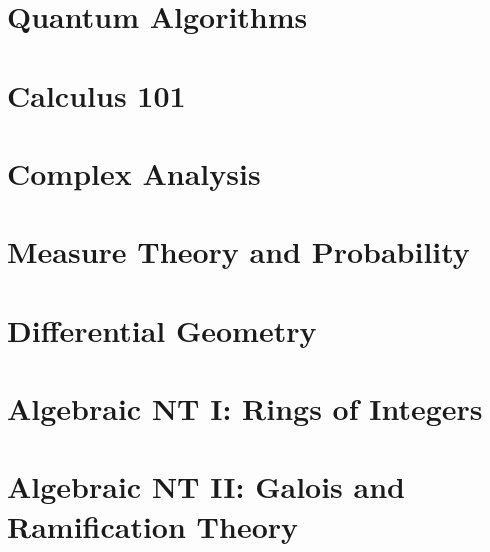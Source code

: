 \documentclass[11pt,twoside=semi,openright,numbers=noenddot]{scrbook}
\begin{document}
\part{Quantum Algorithms}
\parttoc




\part{Calculus 101}
\parttoc






\part{Complex Analysis}
\parttoc




\part{Measure Theory and Probability}
\parttoc











\part{Differential Geometry}
\parttoc



\part{Algebraic NT I: Rings of Integers}
\parttoc






\part{Algebraic NT II: Galois and Ramification Theory}
\parttoc




\end{document}
